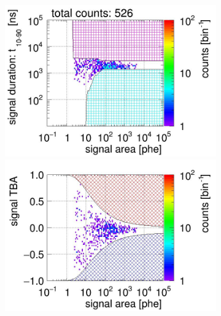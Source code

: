 \begin{landscape}
\begin{figure}[!p]
\begin{subfigure}[t]{0.32\textwidth}
			\caption{}
			\label{fig:signal selection dv -12 03}
		\end{subfigure}
		\begin{subfigure}[t]{0.32\textwidth}
			\centering
			\includegraphics[width=\figurewidth,clip,trim={0 98 0 15}]{Figures/GasTest/CutsValid/res64850/pdpa29Vecfig64850.jpg}
			\includegraphics[width=\figurewidth,clip,trim={0 98 0 40}]{Figures/GasTest/CutsValid/res64850/tbapa29Vecfig64850.jpg}

\end{subfigure}
\end{figure}
\end{landscape}
